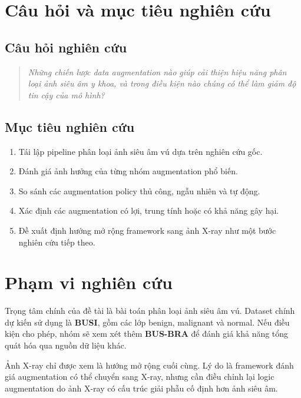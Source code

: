 \documentclass[12pt,a4paper]{article}
\begin{document}
\section{Câu hỏi và mục tiêu nghiên cứu}

\subsection{Câu hỏi nghiên cứu}

\begin{quote}
\textit{Những chiến lược data augmentation nào giúp cải thiện hiệu năng phân loại ảnh siêu âm y khoa, và trong điều kiện nào chúng có thể làm giảm độ tin cậy của mô hình?}
\end{quote}

\subsection{Mục tiêu nghiên cứu}

\begin{enumerate}[label=\textbf{O\arabic*.}]
    \item Tái lập pipeline phân loại ảnh siêu âm vú dựa trên nghiên cứu gốc.
    \item Đánh giá ảnh hưởng của từng nhóm augmentation phổ biến.
    \item So sánh các augmentation policy thủ công, ngẫu nhiên và tự động.
    \item Xác định các augmentation có lợi, trung tính hoặc có khả năng gây hại.
    \item Đề xuất định hướng mở rộng framework sang ảnh X-ray như một bước nghiên cứu tiếp theo.
\end{enumerate}

\section{Phạm vi nghiên cứu}

Trọng tâm chính của đề tài là bài toán phân loại ảnh siêu âm vú. Dataset chính dự kiến sử dụng là \textbf{BUSI}, gồm các lớp benign, malignant và normal. Nếu điều kiện cho phép, nhóm sẽ xem xét thêm \textbf{BUS-BRA} để đánh giá khả năng tổng quát hóa qua nguồn dữ liệu khác.

Ảnh X-ray chỉ được xem là hướng mở rộng cuối cùng. Lý do là framework đánh giá augmentation có thể chuyển sang X-ray, nhưng cần điều chỉnh lại logic augmentation do ảnh X-ray có cấu trúc giải phẫu cố định hơn ảnh siêu âm.
\end{document}
